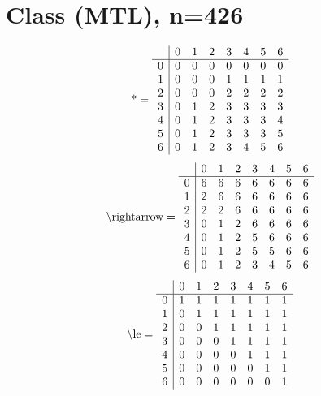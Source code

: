 \documentclass[11pt]{article}
\begin{document}
\section{Class (MTL), n=426}
\[\text{*} = 
\begin{array}{r | r r r r r r r}
 & 0 & 1 & 2 & 3 & 4 & 5 & 6 \\ \hline
0 & 0 & 0 & 0 & 0 & 0 & 0 & 0 \\
1 & 0 & 0 & 0 & 1 & 1 & 1 & 1 \\
2 & 0 & 0 & 0 & 2 & 2 & 2 & 2 \\
3 & 0 & 1 & 2 & 3 & 3 & 3 & 3 \\
4 & 0 & 1 & 2 & 3 & 3 & 3 & 4 \\
5 & 0 & 1 & 2 & 3 & 3 & 3 & 5 \\
6 & 0 & 1 & 2 & 3 & 4 & 5 & 6 \\
\end{array}
\]
\[\text{\textbackslash rightarrow} = 
\begin{array}{r | r r r r r r r}
 & 0 & 1 & 2 & 3 & 4 & 5 & 6 \\ \hline
0 & 6 & 6 & 6 & 6 & 6 & 6 & 6 \\
1 & 2 & 6 & 6 & 6 & 6 & 6 & 6 \\
2 & 2 & 2 & 6 & 6 & 6 & 6 & 6 \\
3 & 0 & 1 & 2 & 6 & 6 & 6 & 6 \\
4 & 0 & 1 & 2 & 5 & 6 & 6 & 6 \\
5 & 0 & 1 & 2 & 5 & 5 & 6 & 6 \\
6 & 0 & 1 & 2 & 3 & 4 & 5 & 6 \\
\end{array}
\]
\[\text{\textbackslash le} = 
\begin{array}{r | r r r r r r r}
 & 0 & 1 & 2 & 3 & 4 & 5 & 6 \\ \hline
0 & 1 & 1 & 1 & 1 & 1 & 1 & 1 \\
1 & 0 & 1 & 1 & 1 & 1 & 1 & 1 \\
2 & 0 & 0 & 1 & 1 & 1 & 1 & 1 \\
3 & 0 & 0 & 0 & 1 & 1 & 1 & 1 \\
4 & 0 & 0 & 0 & 0 & 1 & 1 & 1 \\
5 & 0 & 0 & 0 & 0 & 0 & 1 & 1 \\
6 & 0 & 0 & 0 & 0 & 0 & 0 & 1 \\
\end{array}
\]
\end{document}
